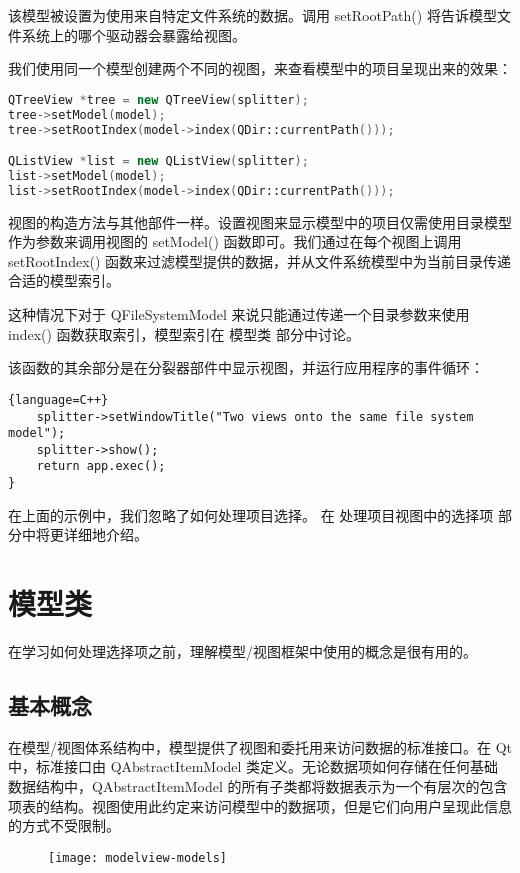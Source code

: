 该模型被设置为使用来自特定文件系统的数据。调用 setRootPath() 将告诉模型文件系统上的哪个驱动器会暴露给视图。

我们使用同一个模型创建两个不同的视图，来查看模型中的项目呈现出来的效果：

\begin{lstlisting}[language=C++]
QTreeView *tree = new QTreeView(splitter);
tree->setModel(model);
tree->setRootIndex(model->index(QDir::currentPath()));

QListView *list = new QListView(splitter);
list->setModel(model);
list->setRootIndex(model->index(QDir::currentPath()));
\end{lstlisting}

视图的构造方法与其他部件一样。设置视图来显示模型中的项目仅需使用目录模型作为参数来调用视图的 setModel() 函数即可。我们通过在每个视图上调用 setRootIndex() 函数来过滤模型提供的数据，并从文件系统模型中为当前目录传递合适的模型索引。

这种情况下对于 QFileSystemModel 来说只能通过传递一个目录参数来使用 index() 函数获取索引，模型索引在 模型类 部分中讨论。

该函数的其余部分是在分裂器部件中显示视图，并运行应用程序的事件循环：

\begin{lstlisting}{language=C++}
    splitter->setWindowTitle("Two views onto the same file system model");
    splitter->show();
    return app.exec();
}
\end{lstlisting}

在上面的示例中，我们忽略了如何处理项目选择。 在 处理项目视图中的选择项 部分中将更详细地介绍。

\section{模型类}

在学习如何处理选择项之前，理解模型/视图框架中使用的概念是很有用的。

\subsection{基本概念}

在模型/视图体系结构中，模型提供了视图和委托用来访问数据的标准接口。在 Qt 中，标准接口由 QAbstractItemModel 类定义。无论数据项如何存储在任何基础数据结构中，QAbstractItemModel 的所有子类都将数据表示为一个有层次的包含项表的结构。视图使用此约定来访问模型中的数据项，但是它们向用户呈现此信息的方式不受限制。

\begin{figure}[hpt!]  
	\centering
    \texttt{[image: modelview-models]}
\end{figure}

